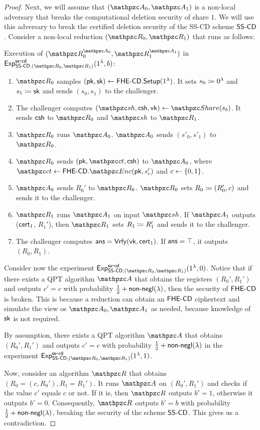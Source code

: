 \begin{proof}
Next, we will assume that $(\qA_0, \qA_1)$ is a non-local adversary
that breaks the computational deletion security of share $1$. We
will use this adversary to break the certified deletion security of
the SS-CD scheme $\mathsf{SS\textrm{-}CD}$. Consider a non-local reduction $(\qR_0,
\qR_1)$ that runs as follows:

\begin{description}
\item Execution of $(\qR_0^{\qA_0}, \qR_1^{\qA_1})$ in
$\expb{\SScd,(\qR_0, \qR_1)}{ss}{cd}(1^\secp,b)$:
\begin{enumerate}
\item $\qR_0$ samples $(\mathsf{pk}, \mathsf{sk}) \leftarrow
\mathsf{FHE\textrm{-}CD}.\mathsf{Setup}(1^\lambda)$. It sets $s_0 \coloneqq 0^\lambda$ and $s_1
\coloneqq \mathsf{sk}$ and sends $(s_0, s_1)$ to the challenger.
\item The challenger computes $(\qsh, \csh, \vk) \leftarrow
\Sh(s_b)$. It sends $\mathsf{csh}$ to $\qR_0$ and $\qsh$ to $\qR_1$.
\item $\qR_0$ runs $\qA_0$. $\qA_0$ sends $(s'_0, s'_1)$ to $\qR_0$.
\item $\qR_0$ sends $(\pk, \qct, \csh)$ to $\qA_0$, where
$\qct \leftarrow \FHEcd.\qEnc(\pk, s'_c)$ and $c \leftarrow \{0,1\}$.
\item $\qA_0$ sends $R_0'$ to $\qR_0$. $\qR_0$ sets $R_0 \coloneqq
(R_0', c)$ and sends it to the challenger.
\item $\qR_1$ runs $\qA_1$ on input $\qsh$. If $\qA_1$ outputs
($\mathsf{cert}_1$, $R_1'$), then $\qR_1$ sets $R_1 \coloneqq R_1'$ and sends
it to the challenger.
\item The challenger computes $\mathsf{ans} = \mathsf{Vrfy}(\mathsf{vk}, \mathsf{cert}_1)$. If $\mathsf{ans}
= \top$, it outputs $(R_0, R_1)$.
\end{enumerate}
\end{description}

Consider now the experiment $\expb{\SScd,(\qR_0,
\qR_1)}{ss}{cd}(1^\secp,0)$. Notice that if there exists a
QPT algorithm $\qA$ that obtains the registers $(R_0', R_1')$ and
outputs $c' = c$ with probability $\frac12 + {\mathsf{non}\textrm{-}\mathsf{negl}}(\lambda)$, then
the security of $\mathsf{FHE\textrm{-}CD}$ is broken. This is because a reduction can
obtain an $\mathsf{FHE\textrm{-}CD}$ ciphertext and simulate the view os $\qA_0,
\qA_1$ as needed, because knowledge of $\mathsf{sk}$ is not required.

By assumption, there exists a QPT algorithm $\qA$ that obtains
$(R_0', R_1')$ and outputs $c'=c$ with probability $\frac12 +
{\mathsf{non}\textrm{-}\mathsf{negl}}(\lambda)$ in the experiment $\expb{\SScd,(\qR_0,
\qR_1)}{ss}{cd}(1^\secp,1)$.

Now, consider an algorithm $\qR$ that obtains $(R_0 = (c, R_0'),
R_1 = R_1')$. It runs $\qA$ on $(R_0', R_1')$ and checks if the
value $c'$ equals $c$ or not. If it is, then $\qR$ outputs $b'=1$,
otherwise it outputs $b'=0$. Consequently, $\qR$ outputs $b'=b$ with
probability $\frac12 + {\mathsf{non}\textrm{-}\mathsf{negl}}(\lambda)$, breaking the security of
the scheme $\mathsf{SS\textrm{-}CD}$. This gives us a contradiction.
\end{proof}

